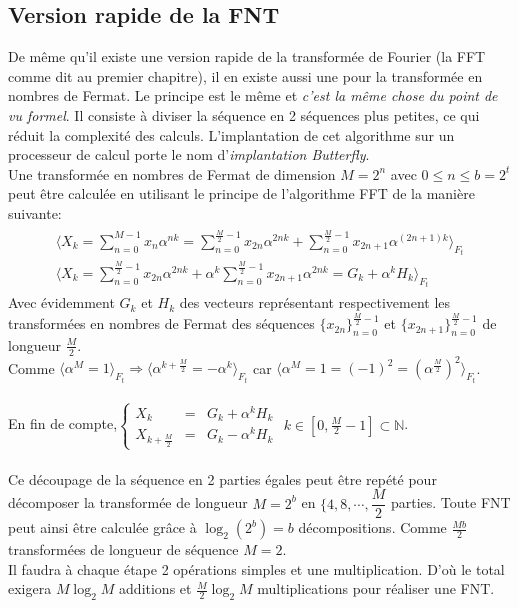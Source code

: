 \subsection{Version rapide de la FNT}\label{Butterfly}
De même qu'il existe une version rapide de la transformée de Fourier (la FFT comme dit au premier chapitre), il en existe aussi une pour la transformée en nombres de Fermat. Le principe est le même et \emph{c'est la même chose du point de vu formel}. Il consiste à diviser la séquence en 2 séquences plus petites, ce qui réduit la complexité des calculs. L'implantation de cet algorithme sur un processeur de calcul porte le nom d'\emph{implantation Butterfly}.\\
Une transformée en nombres de Fermat de dimension $ M = 2^{n} $ avec $ 0 \leq n\leq b = 2^{t} $ peut être calculée en utilisant le principe de l'algorithme FFT de la manière suivante:
\begin{eqnarray}
\begin{aligned}
\langle X_{k} = \sum_{n=0}^{M-1}x_{n}\alpha^{nk} = \sum_{n=0}^{\frac{M}{2}-1}x_{2n}\alpha^{2nk} + \sum_{n=0}^{\frac{M}{2}-1}x_{2n+1}\alpha^{(2n+1)k}\rangle_{F_{t}}\\
\langle X_{k} = \sum_{n=0}^{\frac{M}{2}-1}x_{2n}\alpha^{2nk} + \alpha^{k}\sum_{n=0}^{\frac{M}{2}-1}x_{2n+1}\alpha^{2nk} = G_{k}+\alpha^{k}H_{k}\rangle_{F_{t}}
\end{aligned}
\end{eqnarray}
Avec évidemment $ G_{k} $ et $ H_{k} $ des vecteurs représentant respectivement les transformées en nombres de Fermat des séquences $ \{x_{2n}\}_{n=0}^{\frac{M}{2}-1} $ et $ \{x_{2n+1}\}_{n=0}^{\frac{M}{2}-1} $ de longueur $ \frac{M}{2} $.\\
Comme $ \langle\alpha^{M} = 1\rangle_{F_{t}} \Rightarrow \langle\alpha^{k+\frac{M}{2}} = -\alpha^{k}\rangle_{F_{t}} $ car $ \langle\alpha^{M} = 1 = (-1)^{2} = (\alpha^{\frac{M}{2}})^{2}\rangle_{F_{t}} $.\\
 \\
En fin de compte,$ \left\{\begin{array}{lcl}
X_{k} &=& G_{k} + \alpha^{k}H_{k} \\
X_{k+\frac{M}{2}} &=& G_{k} - \alpha^{k}H_{k}
\end{array}\right. $   $ k\in [0,\frac{M}{2}-1]\subset\mathbb{N} $.\\
 \\
Ce découpage de la séquence en 2 parties égales peut être repété pour décomposer la transformée de longueur $ M = 2^{b} $ en $ \{4,8,\cdots ,\dfrac{M}{2} $ parties. Toute FNT peut ainsi être calculée grâce à $ \log_{2}(2^{b}) = b $ décompositions. Comme $ \frac{Mb}{2} $ transformées de longueur de séquence $ M = 2 $.\\
Il faudra à chaque étape 2 opérations simples et une multiplication. D'où le total exigera $ M\log_{2}M $ additions et $ \frac{M}{2}\log_{2}M $ multiplications pour réaliser une FNT.
